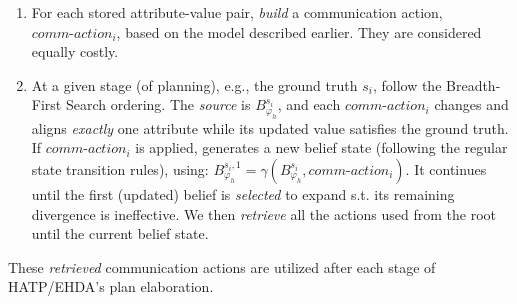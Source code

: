 \documentclass[letterpaper]{article} %
\newtheorem{theorem}{Theorem}[section]
\begin{document}
\begin{itemize}
\begin{enumerate}
        \item For each stored attribute-value pair, \textit{build} a communication action, $\textit{comm-action}_i$, based on the model described earlier. They are considered equally costly.  
        \item 
         
        At a given stage (of planning), e.g., the ground truth $s_i$, follow the Breadth-First Search ordering. 
        The \textit{source} is $B_{\varphi_h}^{s_i}$, and each $\textit{comm-action}_i$ changes and aligns \textit{exactly} one attribute while its updated value satisfies the ground truth. If $\textit{comm-action}_i$ is applied, generates a new belief state (following the regular state transition rules), using: $B_{\varphi_h}^{s_i,1} = \gamma(B_{\varphi_h}^{s_i}, \textit{comm-action}_i)$.
        It continues until the first (updated) belief is \textit{selected} to expand s.t. its remaining divergence is ineffective. We then \textit{retrieve} all the actions used from the root until the current belief state.   
    \end{enumerate}

\end{itemize}



These \textit{retrieved} communication actions are utilized after each stage of HATP/EHDA's plan elaboration.



\end{document}
